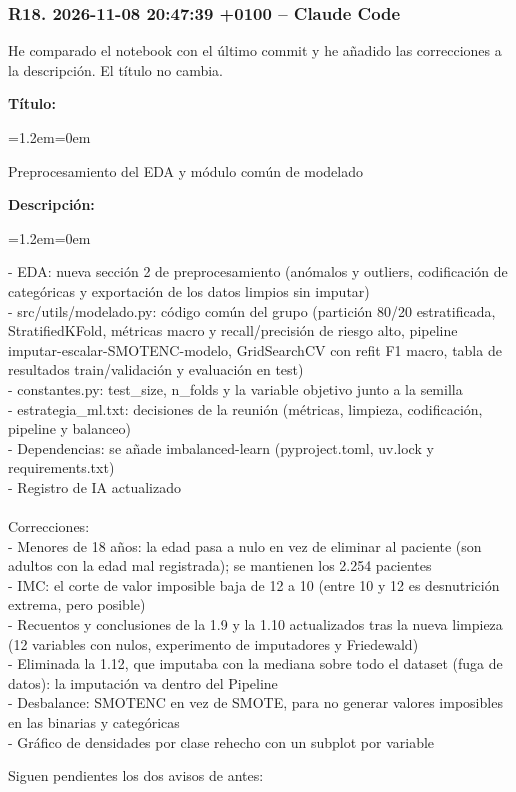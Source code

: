 \documentclass[11pt,a4paper]{article}
\newenvironment{codigo}
  {\par\smallskip\begin{list}{}{\leftmargin=1.2em\rightmargin=0em}\item\relax\ttfamily\scriptsize\raggedright}
  {\end{list}\smallskip}
\begin{document}
\subsubsection*{R18. 2026-11-08 20:47:39 +0100 -- Claude Code}
{\small
He comparado el notebook con el último commit y he añadido las correcciones a la descripción. El título no cambia.

\textbf{Título:}

\begin{codigo}
Preprocesamiento del EDA y módulo común de modelado
\end{codigo}
\textbf{Descripción:}

\begin{codigo}
- EDA: nueva sección 2 de preprocesamiento (anómalos y outliers, codificación de categóricas y exportación de los datos limpios sin imputar) \\{}
- src/\allowbreak{}utils/\allowbreak{}modelado.py: código común del grupo (partición 80/\allowbreak{}20 estratificada, StratifiedKFold, métricas macro y recall/\allowbreak{}precisión de riesgo alto, pipeline imputar-escalar-SMOTENC-modelo, GridSearchCV con refit F1 macro, tabla de resultados train/\allowbreak{}validación y evaluación en test) \\{}
- constantes.py: test\_\allowbreak{}size, n\_\allowbreak{}folds y la variable objetivo junto a la semilla \\{}
- estrategia\_\allowbreak{}ml.txt: decisiones de la reunión (métricas, limpieza, codificación, pipeline y balanceo) \\{}
- Dependencias: se añade imbalanced-learn (pyproject.toml, uv.lock y requirements.txt) \\{}
- Registro de IA actualizado \\{}
\mbox{} \\{}
Correcciones: \\{}
- Menores de 18 años: la edad pasa a nulo en vez de eliminar al paciente (son adultos con la edad mal registrada); se mantienen los 2.254 pacientes \\{}
- IMC: el corte de valor imposible baja de 12 a 10 (entre 10 y 12 es desnutrición extrema, pero posible) \\{}
- Recuentos y conclusiones de la 1.9 y la 1.10 actualizados tras la nueva limpieza (12 variables con nulos, experimento de imputadores y Friedewald) \\{}
- Eliminada la 1.12, que imputaba con la mediana sobre todo el dataset (fuga de datos): la imputación va dentro del Pipeline \\{}
- Desbalance: SMOTENC en vez de SMOTE, para no generar valores imposibles en las binarias y categóricas \\{}
- Gráfico de densidades por clase rehecho con un subplot por variable
\end{codigo}
Siguen pendientes los dos avisos de antes:

}
\end{document}
